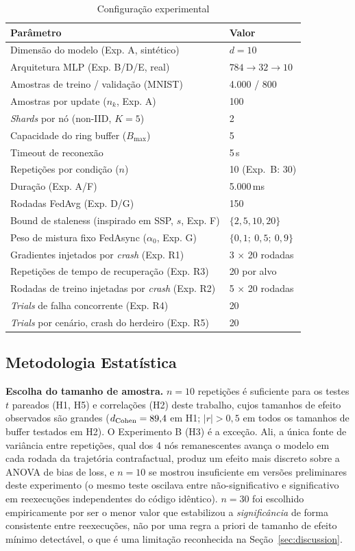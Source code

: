 \documentclass[conference,a4paper]{IEEEtran}
\begin{document}
\begin{table}[H]
\centering
\caption{Configuração experimental}
\label{tab:config}
\small
\begin{tabular}{@{}ll@{}}
\toprule
\textbf{Parâmetro} & \textbf{Valor} \\
\midrule
Dimensão do modelo (Exp. A, sintético) & $d=10$ \\
Arquitetura MLP (Exp. B/D/E, real) & $784 \to 32 \to 10$ \\
Amostras de treino / validação (MNIST) & 4.000 / 800 \\
Amostras por update ($n_k$, Exp. A) & 100 \\
\textit{Shards} por nó (non-IID, $K=5$) & 2 \\
Capacidade do ring buffer ($B_{\max}$) & 5 \\
Timeout de reconexão & 5\,s \\
Repetições por condição ($n$) & 10 (Exp.~B: 30) \\
Duração (Exp. A/F) & 5.000\,ms \\
Rodadas FedAvg (Exp. D/G) & 150 \\
Bound de staleness (inspirado em SSP, $s$, Exp. F) & $\{2, 5, 10, 20\}$ \\
Peso de mistura fixo FedAsync ($\alpha_0$, Exp. G) & $\{0{,}1;\ 0{,}5;\ 0{,}9\}$ \\
Gradientes injetados por \textit{crash} (Exp. R1) & 3 $\times$ 20 rodadas \\
Repetições de tempo de recuperação (Exp. R3) & 20 por alvo \\
Rodadas de treino injetadas por \textit{crash} (Exp. R2) & 5 $\times$ 20 rodadas \\
\textit{Trials} de falha concorrente (Exp. R4) & 20 \\
\textit{Trials} por cenário, crash do herdeiro (Exp. R5) & 20 \\
\bottomrule
\end{tabular}
\end{table}

\subsection{Metodologia Estatística}
\label{sec:stat_methodology}

\textbf{Escolha do tamanho de amostra.} $n=10$ repetições é suficiente para
os testes $t$ pareados (H1, H5) e correlações (H2) deste trabalho, cujos
tamanhos de efeito observados são grandes ($d_{\text{Cohen}}=89{,}4$
em H1; $|r|>0{,}5$ em todos os tamanhos de buffer testados em H2). O
Experimento B (H3) é a exceção. Ali, a única fonte de variância entre
repetições, qual dos 4 nós remanescentes avança o modelo em cada rodada da
trajetória contrafactual, produz um efeito mais discreto sobre a ANOVA
de bias de loss, e $n=10$ se mostrou insuficiente em versões preliminares
deste experimento (o mesmo teste oscilava entre não-significativo e
significativo em reexecuções independentes do código idêntico). $n=30$ foi
escolhido empiricamente por ser o menor valor que estabilizou a
\emph{significância} de forma consistente entre reexecuções, não por
uma regra a priori de tamanho de efeito mínimo detectável, o que é uma limitação
reconhecida na Seção~\ref{sec:discussion}.
\end{document}
